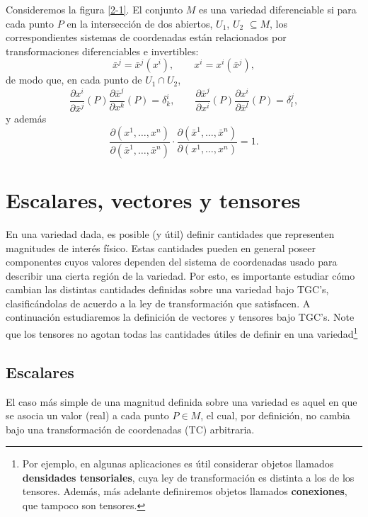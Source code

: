 Consideremos la figura \ref{2-1}. El conjunto $M$ es una variedad diferenciable
si para cada punto $P$ en la
intersección de dos abiertos, $U_1$, $U_2$ $\subseteq M$, los
correspondientes sistemas de coordenadas están relacionados por transformaciones diferenciables e invertibles: 
\begin{equation}
\bar{x}^j  =\bar{x}^j (x^i ), \qquad x^i  =x^i (\bar{x}^j ),\label{v1}
\end{equation}
de modo que, en cada punto de $U_1\cap U_2$,
\begin{equation}
\frac{\partial x^i}{\partial\bar{x}^j}(P)\frac{\partial\bar{x}^j}{\partial
x^k}(P)=\delta_k^i, \qquad \frac{\partial\bar{x}^j}{\partial x^i}(P)\frac{\partial x^i}{\partial\bar{x}^l}(P)=\delta_l^j , \label{v2}
\end{equation}
y además
\begin{equation}
\frac{\partial(x^1,\dots ,x^n)}{\partial(\bar{x}^1
,\dots ,\bar{x}^n)}\cdot\frac{\partial(\bar{x}^1,\dots
,\bar{x}^n)}{\partial (x^1,\dots ,x^n)}=1. \label{v3}
\end{equation}

\section{Escalares, vectores y tensores}

En una variedad dada, es posible (y útil) definir cantidades que representen magnitudes de interés físico. Estas cantidades pueden en general poseer componentes cuyos valores dependen del sistema de coordenadas usado para describir una cierta región de la variedad. Por esto, es importante estudiar cómo cambian las distintas cantidades definidas sobre una variedad bajo TGC's, clasificándolas de acuerdo a la ley de transformación que satisfacen. A continuación estudiaremos la definición de vectores y tensores bajo TGC's. Note que los tensores no agotan todas las cantidades útiles de definir en una variedad\footnote{Por ejemplo, en algunas aplicaciones es útil considerar objetos llamados \textbf{densidades tensoriales}, cuya ley de transformación es distinta a los de los tensores. Además, más adelante definiremos objetos llamados \textbf{conexiones}, que tampoco son tensores.}

\subsection{Escalares}
El caso más simple de una magnitud definida sobre una variedad es aquel en que se asocia un valor (real) a cada punto $P\in M$, el cual, por definición, no cambia bajo una transformación de coordenadas (TC) arbitraria.


